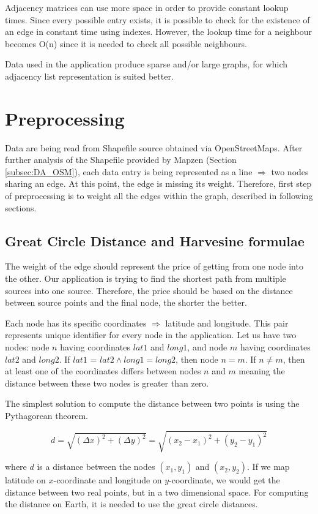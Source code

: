 \documentclass[thesis=M,english]{FITthesis}[2012/10/20]
\begin{document}
Adjacency matrices can use more space in order to provide constant lookup times. Since every possible entry exists, it is possible to check for the existence of an edge in constant time using indexes. However, the lookup time for a neighbour becomes O(n) since it is needed to check all possible neighbours.

Data used in the application produce sparse and/or large graphs, for which adjacency list representation is suited better.



\section{Preprocessing}
\label{sec:preprocessing}
Data are being read from Shapefile source obtained via OpenStreetMaps. After further analysis of the Shapefile provided by Mapzen (Section \ref{subsec:DA_OSM}), each data entry is being represented as a line $\Rightarrow$ two nodes sharing an edge. At this point, the edge is missing its weight. Therefore, first step of preprocessing is to weight all the edges within the graph, described in following sections.

\subsection{Great Circle Distance and Harvesine formulae}
\label{subsec:GCD}
The weight of the edge should represent the price of getting from one node into the other. Our application is trying to find the shortest path from multiple sources into one source. Therefore, the price should be based on the distance between source points and the final node, the shorter the better. 

Each node has its specific coordinates $\Rightarrow$ latitude and longitude. This pair represents unique identifier for every node in the application. Let us have two nodes: node $n$ having coordinates $lat1$ and $long1$, and node $m$ having coordinates $lat2$ and $long2$. If $lat1$ = $lat2 \wedge long1 = long2$, then node $n = m$. If $n \neq m$, then at least one of the coordinates differs between nodes $n$ and $m$ meaning the distance between these two nodes is greater than zero.

The simplest solution to compute the distance between two points is using the Pythagorean theorem.

$$
d = \sqrt{(\Delta x)^2 + (\Delta y)^2} = \sqrt{(x_2 - x_1 )^2 + (y_2 - y_1)^2}
$$

where $d$ is a distance between the nodes $(x_1, y_1)$ and $(x_2, y_2)$. If we map latitude on $x$-coordinate and longitude on $y$-coordinate, we would get the distance between two real points, but in a two dimensional space. For computing the distance on Earth, it is needed to use the great circle distances.
\end{document}
